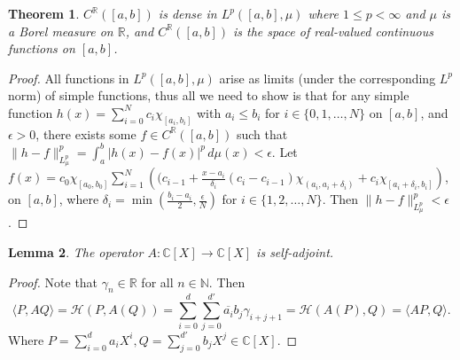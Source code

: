 \documentclass[12pt,oneside]{report}
\newtheorem{thm}{Theorem}[chapter]
\newtheorem{lem}[thm]{Lemma}
\begin{document}

\begin{thm}\label{C-dense-in-Lp}
    $C^{\mathbb{R}}([a,b])$ is dense in $L^{p}([a,b], \mu)$ where $1 \leq p <\infty$ and $\mu$ is a Borel measure on $\mathbb{R}$, and $C^{\mathbb{R}}([a,b])$ is the space of real-valued continuous functions on $[a,b]$.
\end{thm}
\begin{proof}
    All functions in $L^{p}([a,b],\mu)$ arise as limits (under the corresponding $L^{p}$ norm) of simple functions, thus all we need to show is that for any simple function $h(x) = \sum_{i=0}^{N}c_{i}\chi_{[a_{i},b_{i}]}$ with $a_{i} \leq b_{i}$ for $i \in \{ 0,1,\dots,N \}$ on $[a,b]$, and $\epsilon > 0$, there exists some $f \in C^{\mathbb{R}}([a,b])$ such that $\|h - f\|_{L^{p}_{\mu}}^p = \int _{a}^{b} |h(x) - f(x)|^{p} \, d\mu(x) < \epsilon$. Let $f(x) = c_{0}\chi_{[a_{0},b_{0}]} \sum_{i=1}^{N} \left( (c_{i-1} + \frac{x - a_{i}}{\delta_{i}}(c_{i} - c_{i-1})\chi_{(a_{i},a_{i}+\delta_{i})} + c_{i}\chi_{\left[ a_{i} + \delta_{i}, b_{i} \right]} \right)$, on $[a,b]$, where $\delta_{i} = \min\left( \frac{b_{i} - a_{i}}{2}, \frac{\epsilon}{N} \right)$ for $i \in \{ 1,2,\dots,N \}$. Then $\|h - f\|_{L^{p}_{\mu}}^p < \epsilon$.
\end{proof}

\begin{lem}\label{A-selfadj}
    The operator $A: \mathbb{C}[X] \to \mathbb{C}[X]$ is self-adjoint.
\end{lem}
\begin{proof}
    Note that $\gamma_{n} \in \mathbb{R}$ for all $n \in \mathbb{N}$. Then
    $$\langle P, AQ \rangle = \mathcal{H}(P,A(Q)) = \sum_{i=0}^{d} \sum_{j=0}^{d'} \overline{a_{i}}b_{j} \gamma_{i+j+1} = \mathcal{H}(A(P),Q) = \langle AP, Q \rangle.$$
    Where $P = \sum_{i=0}^{d}a_{i}X^{i}, Q = \sum_{j=0}^{d'}b_{j}X^{j} \in \mathbb{C}[X]$.
\end{proof}
\end{document}
